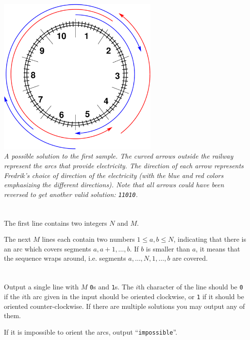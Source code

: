 \vspace{2mm}
\hspace*{2mm}\includegraphics[width=8cm]{alternatingfig.pdf}
\vspace{1mm} \\
{\em A possible solution to the first sample. The curved arrows outside the railway represent the arcs that provide electricity. The direction of each arrow represents Fredrik's choice of direction of the electricity (with the blue and red colors emphasizing the different directions). Note that all arrows could have been reversed to get another valid solution: \texttt{11010}.}

\section*{}
The first line contains two integers $N$ and $M$.

The next $M$ lines each contain two numbers $1 \le a, b \le N$, indicating that
there is an arc which covers segments $a, a+1, \dots, b$. If $b$ is smaller
than $a$, it means that the sequence wraps around, i.e. segments
$a, \dots, N, 1, \dots, b$ are covered.

\section*{\outputsection}
Output a single line with $M$ \texttt{0}s and \texttt{1}s. The $i$th character of the
line should be \texttt{0} if the $i$th arc given in the input should be oriented
clockwise, or \texttt{1} if it should be oriented counter-clockwise.
If there are multiple solutions you may output any of them.

If it is impossible to orient the arcs, output ``\texttt{impossible}''.

